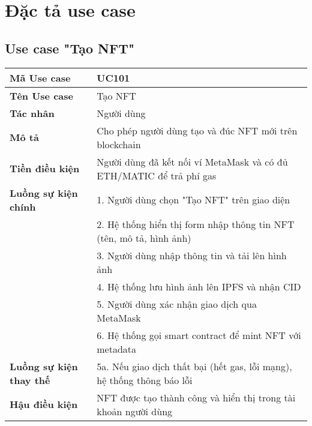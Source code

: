 \documentclass[a4paper,12pt]{report}
\begin{document}
\section{Đặc tả use case}

\subsection{Use case "Tạo NFT"}
\begin{tabular}{|l|p{10cm}|}
    \hline
    \textbf{Mã Use case} & UC101 \\
    \hline
    \textbf{Tên Use case} & Tạo NFT \\
    \hline
    \textbf{Tác nhân} & Người dùng \\
    \hline
    \textbf{Mô tả} & Cho phép người dùng tạo và đúc NFT mới trên blockchain \\
    \hline
    \textbf{Tiền điều kiện} & Người dùng đã kết nối ví MetaMask và có đủ ETH/MATIC để trả phí gas \\
    \hline
    \textbf{Luồng sự kiện chính} & 1. Người dùng chọn "Tạo NFT" trên giao diện \\
    & 2. Hệ thống hiển thị form nhập thông tin NFT (tên, mô tả, hình ảnh) \\
    & 3. Người dùng nhập thông tin và tải lên hình ảnh \\
    & 4. Hệ thống lưu hình ảnh lên IPFS và nhận CID \\
    & 5. Người dùng xác nhận giao dịch qua MetaMask \\
    & 6. Hệ thống gọi smart contract để mint NFT với metadata \\
    \hline
    \textbf{Luồng sự kiện thay thế} & 5a. Nếu giao dịch thất bại (hết gas, lỗi mạng), hệ thống thông báo lỗi \\
    \hline
    \textbf{Hậu điều kiện} & NFT được tạo thành công và hiển thị trong tài khoản người dùng \\
    \hline
\end{tabular}
\end{document}
